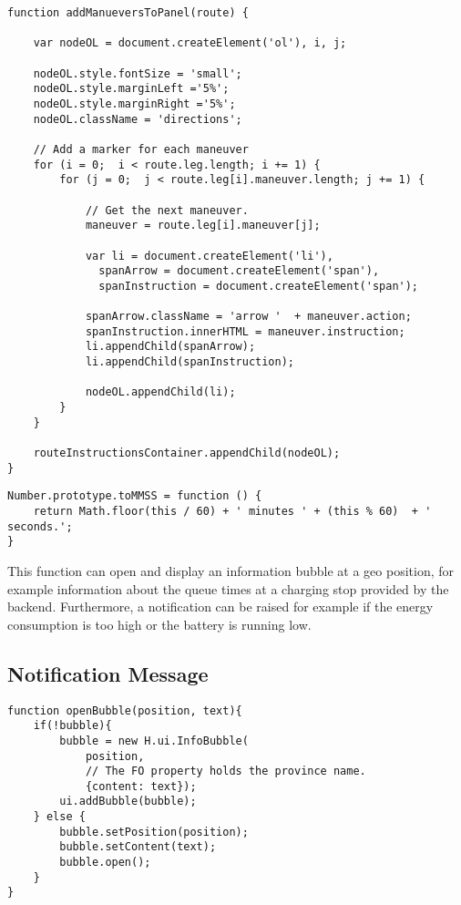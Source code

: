 \begin{verbatim}
function addManueversToPanel(route) {

    var nodeOL = document.createElement('ol'), i, j;

    nodeOL.style.fontSize = 'small';
    nodeOL.style.marginLeft ='5%';
    nodeOL.style.marginRight ='5%';
    nodeOL.className = 'directions';

    // Add a marker for each maneuver
    for (i = 0;  i < route.leg.length; i += 1) {
        for (j = 0;  j < route.leg[i].maneuver.length; j += 1) {

            // Get the next maneuver.
            maneuver = route.leg[i].maneuver[j];

            var li = document.createElement('li'),
              spanArrow = document.createElement('span'),
              spanInstruction = document.createElement('span');

            spanArrow.className = 'arrow '  + maneuver.action;
            spanInstruction.innerHTML = maneuver.instruction;
            li.appendChild(spanArrow);
            li.appendChild(spanInstruction);

            nodeOL.appendChild(li);
        }
    }

    routeInstructionsContainer.appendChild(nodeOL);
}
\end{verbatim}

\begin{verbatim}
Number.prototype.toMMSS = function () {
    return Math.floor(this / 60) + ' minutes ' + (this % 60)  + ' seconds.';
}
\end{verbatim}

This function can open and display an information bubble at a geo position, for example information about the queue times at a charging stop provided by the backend. Furthermore, a notification can be raised for example if the energy consumption is too high or the battery is running low. 


\subsection{Notification Message}

\begin{verbatim}
function openBubble(position, text){
    if(!bubble){
        bubble = new H.ui.InfoBubble(
            position,
            // The FO property holds the province name.
            {content: text});
        ui.addBubble(bubble);
    } else {
        bubble.setPosition(position);
        bubble.setContent(text);
        bubble.open();
    }
}
\end{verbatim}

